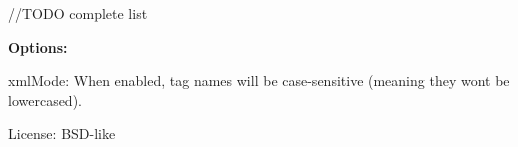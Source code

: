 //\+T\+O\+DO complete list

{\bfseries Options\+:}


\begin{DoxyItemize}
\item {\ttfamily xml\+Mode}\+: When enabled, tag names will be case-\/sensitive (meaning they won\textquotesingle{}t be lowercased). 


\end{DoxyItemize}

License\+: B\+S\+D-\/like 
